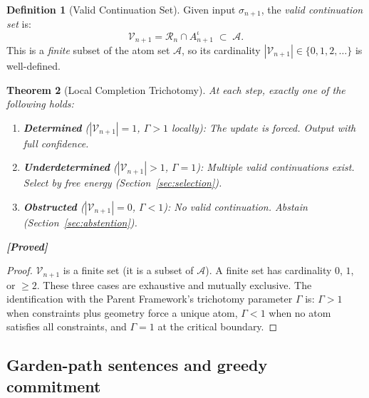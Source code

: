 \documentclass[11pt,a4paper]{article}
\newtheorem{theorem}{Theorem}[section]
\theoremstyle{definition}
\newtheorem{definition}[theorem]{Definition}
\theoremstyle{remark}
\newcommand{\statusproved}{\textcolor{green!50!black}{\textbf{[Proved]}}}
\begin{document}

\begin{definition}[Valid Continuation Set]\label{def:valid}
Given input $\sigma_{n+1}$, the \emph{valid continuation set} 
is:
\begin{equation}\label{eq:valid}
    \mathcal{V}_{n+1} = \mathcal{R}_n \cap A_{n+1}^{\iota}
    \;\subset\; \mathcal{A}.
\end{equation}
This is a \emph{finite} subset of the atom set $\mathcal{A}$, 
so its cardinality $|\mathcal{V}_{n+1}| \in \{0, 1, 2, \ldots\}$ 
is well-defined.
\end{definition}

\begin{theorem}[Local Completion Trichotomy]\label{thm:trichotomy}
At each step, exactly one of the following holds:
\begin{enumerate}[label=(\alph*),nosep]
    \item \textbf{Determined} ($|\mathcal{V}_{n+1}| = 1$, 
    $\Gamma > 1$ locally): The update is forced. Output with 
    full confidence.
    \item \textbf{Underdetermined} ($|\mathcal{V}_{n+1}| > 1$, 
    $\Gamma = 1$): Multiple valid continuations exist. Select 
    by free energy (Section~\ref{sec:selection}).
    \item \textbf{Obstructed} ($|\mathcal{V}_{n+1}| = 0$, 
    $\Gamma < 1$): No valid continuation. Abstain 
    (Section~\ref{sec:abstention}).
\end{enumerate}
\statusproved
\end{theorem}

\begin{proof}
$\mathcal{V}_{n+1}$ is a finite set (it is a subset of 
$\mathcal{A}$). A finite set has cardinality $0$, $1$, or 
$\geq 2$. These three cases are exhaustive and mutually exclusive. 
The identification with the Parent Framework's trichotomy parameter 
$\Gamma$ is: $\Gamma > 1$ when constraints plus geometry force a 
unique atom, $\Gamma < 1$ when no atom satisfies all constraints, 
and $\Gamma = 1$ at the critical boundary.
\end{proof}

\subsection{Garden-path sentences and greedy commitment}%
\label{sec:garden_path}
\end{document}
